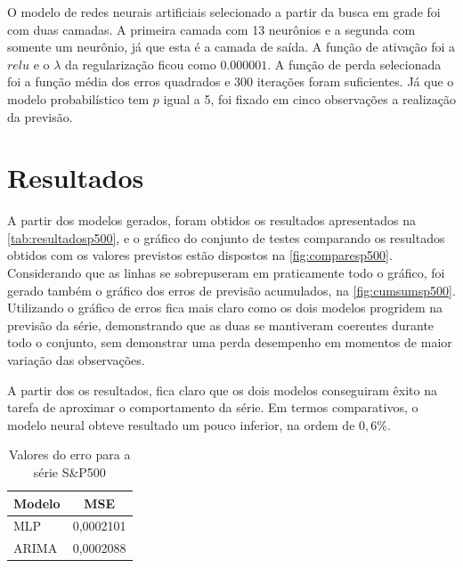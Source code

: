 \documentclass[
    12pt,
    oneside,
    a4paper,
    english,
    brazil
]{abntex2}
\begin{document}
O modelo  de redes neurais artificiais  selecionado a partir da  busca em grade
foi  com duas  camadas. A  primeira camada  com 13  neurônios e  a segunda  com
somente um neurônio, já que esta é a  camada de saída. A função de ativação foi
a $relu$  e o  $\lambda$ da  regularização ficou como  $0.000001$. A  função de
perda selecionada foi a função média  dos erros quadrados e 300 iterações foram
suficientes. Já que  o modelo probabilístico tem  $p$ igual a 5,  foi fixado em
cinco observações a realização da previsão.

\chapter{Resultados}\label{chap:result}

A  partir dos  modelos gerados,  foram  obtidos os  resultados apresentados  na
\autoref{tab:resultadosp500},  e o  gráfico  do conjunto  de testes  comparando
os   resultados  obtidos   com  os   valores  previstos   estão  dispostos   na
\autoref{fig:comparesp500}.  Considerando  que  as linhas  se  sobrepuseram  em
praticamente todo o gráfico, foi gerado  também o gráfico dos erros de previsão
acumulados, na  \autoref{fig:cumsumsp500}. Utilizando  o gráfico de  erros fica
mais claro  como os dois modelos  progridem na previsão da  série, demonstrando
que as duas se mantiveram coerentes durante todo o conjunto, sem demonstrar uma
perda desempenho em momentos de maior variação das observações.

A partir dos os resultados, fica claro que os dois modelos conseguiram êxito na
tarefa de aproximar o comportamento da  série. Em termos comparativos, o modelo
neural obteve resultado um pouco inferior, na ordem de $0,6\%$.

\begin{table}[ht]
    \centering
    \caption{Valores do erro para a série S\&P500}\label{tab:resultadosp500}
    \begin{tabular}{ll}
        \multicolumn{1}{c}{Modelo} & \multicolumn{1}{c}{MSE} \\
        \toprule
        MLP                        & 0,0002101               \\
        ARIMA                      & 0,0002088
    \end{tabular}
\end{table}
\end{document}
